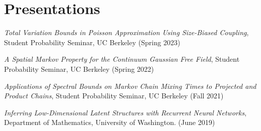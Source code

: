 \section{\sc Presentations}




\emph{Total Variation Bounds in Poisson Approximation Using Size-Biased Coupling}, Student Probability Seminar, UC Berkeley (Spring 2023)


\emph{A Spatial Markov Property for the Continuum Gaussian Free Field}, Student Probability Seminar, UC Berkeley (Spring 2022)

\emph{Applications of Spectral Bounds on Markov Chain Mixing Times to Projected and Product Chains}, Student Probability Seminar, UC Berkeley (Fall 2021)

\emph{Inferring Low-Dimensional Latent Structures with Recurrent Neural Networks}, Department of Mathematics, University of Washington.  (June 2019)


\endinput